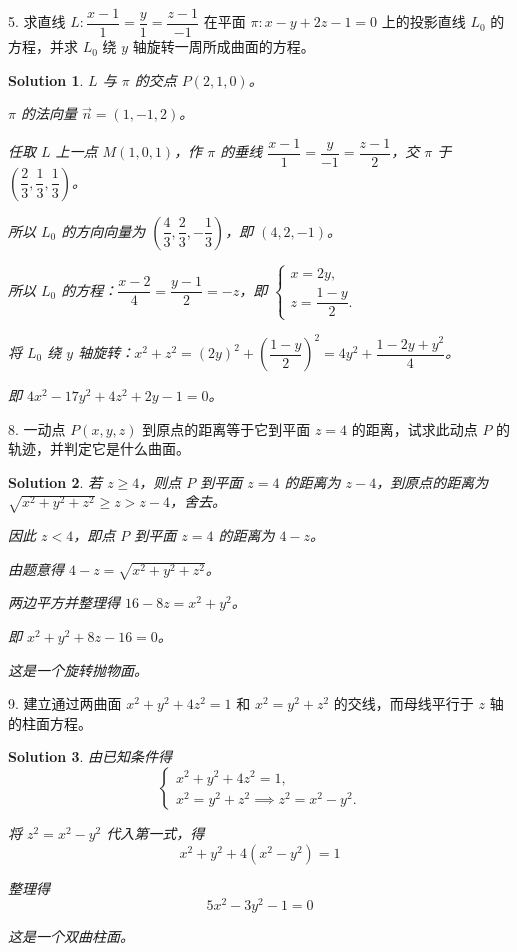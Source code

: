 \documentclass[a4paper,12pt]{article}
\newtheorem*{sol}{Solution}
\begin{document}
5. 求直线 $L: \dfrac{x - 1}{1} = \dfrac{y}{1} = \dfrac{z - 1}{-1}$ 在平面 $\pi: x - y + 2z - 1 = 0$ 上的投影直线 $L_0$ 的方程，并求 $L_0$ 绕 $y$ 轴旋转一周所成曲面的方程。

\begin{sol}
    $L$ 与 $\pi$ 的交点 $P(2,1,0)$。

    $\pi$ 的法向量 $\overrightarrow{n}=(1,-1,2)$。

    任取 $L$ 上一点 $M(1,0,1)$，作 $\pi$ 的垂线 $\dfrac{x-1}{1}=\dfrac{y}{-1}=\dfrac{z-1}{2}$，交 $\pi$ 于 $\left(\dfrac{2}{3},\dfrac{1}{3},\dfrac{1}{3}\right)$。

    所以 $L_0$ 的方向向量为 $\left(\dfrac{4}{3},\dfrac{2}{3},-\dfrac{1}{3}\right)$，即 $(4,2,-1)$。

    所以 $L_0$ 的方程：$\dfrac{x-2}{4}=\dfrac{y-1}{2}=-z$，即 $\begin{cases}
            x=2y, \\
            z=\dfrac{1-y}{2}.
        \end{cases}$

    将 $L_0$ 绕 $y$ 轴旋转：$x^2+z^2=(2y)^2+\left(\dfrac{1-y}{2}\right)^2=4y^2+\dfrac{1-2y+y^2}{4}$。

    即 $4x^2-17y^2+4z^2+2y-1=0$。
\end{sol}

8. 一动点 $P(x, y, z)$ 到原点的距离等于它到平面 $z = 4$ 的距离，试求此动点 $P$ 的轨迹，并判定它是什么曲面。

\begin{sol}
    若 $z \geqslant 4$，则点 $P$ 到平面 $z = 4$ 的距离为 $z - 4$，到原点的距离为 $\sqrt{x^2 + y^2 + z^2} \geqslant z > z - 4$，舍去。

    因此 $z < 4$，即点 $P$ 到平面 $z = 4$ 的距离为 $4 - z$。

    由题意得 $4 - z = \sqrt{x^2 + y^2 + z^2}$。

    两边平方并整理得 $16 - 8z = x^2 + y^2$。

    即 $x^2 + y^2 + 8z - 16 = 0$。

    这是一个旋转抛物面。
\end{sol}

9. 建立通过两曲面 $x^2 + y^2 + 4z^2 = 1$ 和 $x^2 = y^2 + z^2$ 的交线，而母线平行于 $z$ 轴的柱面方程。

\begin{sol}
    由已知条件得
    $$\begin{cases}
            x^2 + y^2 + 4z^2 = 1, \\
            x^2 = y^2 + z^2 \implies z^2 = x^2 - y^2.
        \end{cases}$$

    将 $z^2 = x^2 - y^2$ 代入第一式，得
    $$x^2 + y^2 + 4(x^2 - y^2) = 1$$

    整理得
    $$5x^2 - 3y^2 - 1 = 0$$

    这是一个双曲柱面。
\end{sol}
\end{document}
